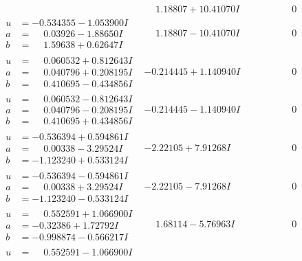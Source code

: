 \documentclass[1p]{elsarticle_modified}
\theoremstyle{definition}
\begin{document}
$$\begin{array}{c|c|c}
 & \phantom{-}1.18807 + 10.41070 I & \phantom{-0.000000 } 0 \\ \hline\begin{aligned}
u &= -0.534355 - 1.053900 I \\
a &= \phantom{-}0.03926 - 1.88650 I \\
b &= \phantom{-}1.59638 + 0.62647 I\end{aligned}
 & \phantom{-}1.18807 - 10.41070 I & \phantom{-0.000000 } 0 \\ \hline\begin{aligned}
u &= \phantom{-}0.060532 + 0.812643 I \\
a &= \phantom{-}0.040796 + 0.208195 I \\
b &= \phantom{-}0.410695 - 0.434856 I\end{aligned}
 & -0.214445 + 1.140940 I & \phantom{-0.000000 } 0 \\ \hline\begin{aligned}
u &= \phantom{-}0.060532 - 0.812643 I \\
a &= \phantom{-}0.040796 - 0.208195 I \\
b &= \phantom{-}0.410695 + 0.434856 I\end{aligned}
 & -0.214445 - 1.140940 I & \phantom{-0.000000 } 0 \\ \hline\begin{aligned}
u &= -0.536394 + 0.594861 I \\
a &= \phantom{-}0.00338 - 3.29524 I \\
b &= -1.123240 + 0.533124 I\end{aligned}
 & -2.22105 + 7.91268 I & \phantom{-0.000000 } 0 \\ \hline\begin{aligned}
u &= -0.536394 - 0.594861 I \\
a &= \phantom{-}0.00338 + 3.29524 I \\
b &= -1.123240 - 0.533124 I\end{aligned}
 & -2.22105 - 7.91268 I & \phantom{-0.000000 } 0 \\ \hline\begin{aligned}
u &= \phantom{-}0.552591 + 1.066900 I \\
a &= -0.32386 + 1.72792 I \\
b &= -0.998874 - 0.566217 I\end{aligned}
 & \phantom{-}1.68114 - 5.76963 I & \phantom{-0.000000 } 0 \\ \hline\begin{aligned}
u &= \phantom{-}0.552591 - 1.066900 I \\

\end{aligned}
\end{array}$$
\end{document}

